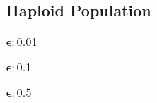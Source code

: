 \subsection{Haploid Population}
\subsubsection{$\bm{\epsilon: 0.01}$}

\subsubsection{$\bm{\epsilon: 0.1}$}

\subsubsection{$\bm{\epsilon: 0.5}$}

% 
% 
% 
